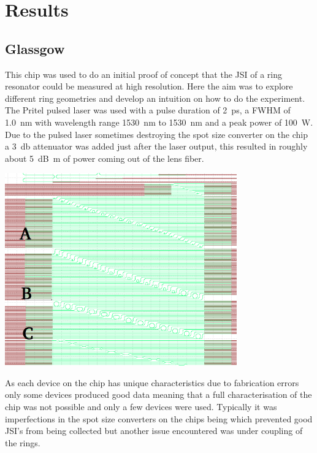 \newpage
\section{Results}
\subsection{Glassgow}
This chip was used to do an initial proof of concept that the JSI of a ring resonator could be measured at high resolution. Here the aim was to explore different ring geometries and develop an intuition on how to do the experiment. The Pritel pulsed laser was used with a pulse duration of \SI{2}{\pico\second}, a FWHM of \SI{1.0}{\nano\meter} with wavelength range \SI{1530}{\nano\meter} to \SI{1530}{\nano\meter} and a peak power of \SI{100}{\watt}. Due to the pulsed laser sometimes destroying the spot size converter on the chip a \SI{3}{\decibel} attenuator was added just after the laser output, this resulted in roughly about \SI{5}{\deci\bel\m} of power coming out of the lens fiber.

\begingroup
    \centering  
    \includegraphics[width=10cm]{img/method/glassgowChipNumbering.png}
     \vspace{3pt} \label{glassgowChip}
\endgroup

As each device on the chip has unique characteristics due to fabrication errors only some devices produced good data meaning that a full characterisation of the chip was not possible and only a few devices were used. Typically it was imperfections in the spot size converters on the chips being which prevented good JSI's from being collected but another issue encountered was under coupling of the rings.

